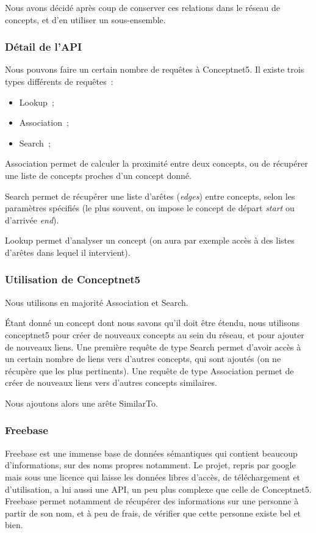 \documentclass[a4paper, 12pt]{article}
\newcommand{\ang}[1]{\textit{#1}}%
\begin{document}
Nous avons décidé après coup de conserver ces relations dans le réseau de concepts, et d'en utiliser un sous-ensemble.

\subsubsection{Détail de l'API}

Nous pouvons faire un certain nombre de requêtes à Conceptnet5. Il existe trois types différents de requêtes~:
\begin{itemize}
 \item Lookup~;
 \item Association~;
 \item Search~;
\end{itemize}
Association permet de calculer la proximité entre deux concepts, ou de récupérer une liste de concepts proches d'un concept donné.

Search permet de récupérer une liste d'arêtes (\ang{edges}) entre concepts, selon les paramètres spécifiés (le plus souvent, on impose le concept de départ \ang{start} ou d'arrivée \ang{end}).

Lookup permet d'analyser un concept (on aura par exemple accès à des listes d'arêtes dans lequel il intervient).


\subsubsection{Utilisation de Conceptnet5}

Nous utilisons en majorité Association et Search.

Étant donné un concept dont nous savons qu'il doit être étendu, nous utilisons conceptnet5 pour créer de nouveaux concepts au sein du réseau, et pour ajouter de nouveaux liens. Une première requête de type Search permet d'avoir accès à un certain nombre de liens vers d'autres concepts, qui sont ajoutés (on ne récupère que les plus pertinents). Une requête de type Association permet de créer de nouveaux liens vers d'autres concepts similaires.

Nous ajoutons alors une arête SimilarTo.

\subsubsection{Freebase}

Freebase est une immense base de données sémantiques qui contient beaucoup d'informations, sur des noms propres notamment. Le projet, repris par google mais sous une licence qui laisse les données libres d'accès, de téléchargement et d'utilisation, a lui aussi une API, un peu plus complexe que celle de Conceptnet5. Freebase permet notamment de récupérer des informations sur une personne à partir de son nom, et à peu de frais, de vérifier que cette personne existe bel et bien.
\end{document}
